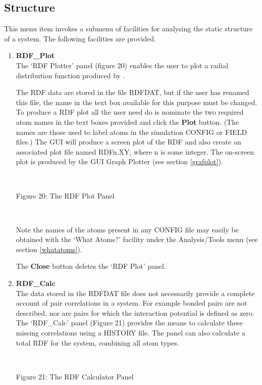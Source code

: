 \subsection{Structure}
This menu item invokes a submenu of facilities for analysing the static
structure of a system. The following facilities are provided.
\begin{enumerate}
\item {\bf RDF\_Plot}\\
The `RDF Plotter' panel (figure 20) enables the user to plot a radial
distribution function produced by \DD{}. \label{rdfplot}

The RDF data are stored in the file RDFDAT, but if the user has
renamed this file, the name in the text box available for this purpose
must be changed. To produce a RDF plot all the user need do is nominate
the two required atom names in the text boxes provided and click the
{\bf Plot} button. (The names are those used to label atoms in the
simulation CONFIG or FIELD files.)  The GUI will produce a screen plot
of the RDF and also create an associated plot file named RDFn.XY,
where n is some integer. The on-screen plot is produced
by the GUI Graph Plotter (see section \ref{grafplot}).

~

\vskip 5mm
\centerline{}
\centerline{Figure 20: The RDF Plot Panel}
\vskip 5mm

~

\noindent
Note the names of the atoms present in any CONFIG file may easily be
obtained with the `What Atoms?' facility under the Analysis/Tools menu
(see section \ref{whatatoms}).

The {\bf Close} button deletes the `RDF Plot' panel.

\item {\bf RDF\_Calc}\\
The data stored in the RDFDAT file does not necessarily provide a
complete account of pair correlations in a system. For example bonded
pairs are not described, nor are pairs for which the interaction
potential is defined as zero. The `RDF\_Calc' panel (Figure 21)
provides the means to calculate these missing correlations using a \DD{}
HISTORY file. The panel can also calculate a total RDF for the system,
combining all atom types.

~

\vskip 5mm
\centerline{}
\centerline{Figure 21: The RDF Calculator Panel}
\vskip 5mm


\end{enumerate}

